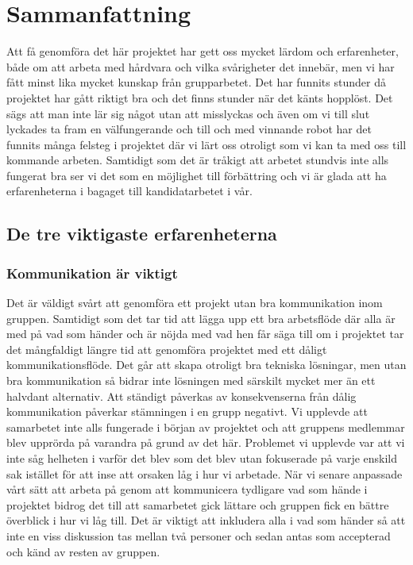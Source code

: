 \documentclass{article}
\begin{document}
\section{Sammanfattning}
Att få genomföra det här projektet har gett oss mycket lärdom och erfarenheter, både om att arbeta med hårdvara och vilka svårigheter det innebär, men vi har fått minst lika mycket kunskap från grupparbetet. Det har funnits stunder då projektet har gått riktigt bra och det finns stunder när det känts hopplöst. Det sägs att man inte lär sig något utan att misslyckas och även om vi till slut lyckades ta fram en välfungerande och till och med vinnande robot har det funnits många felsteg i projektet där vi lärt oss otroligt som vi kan ta med oss till kommande arbeten. Samtidigt som det är tråkigt att arbetet stundvis inte alls fungerat bra ser vi det som en möjlighet till förbättring och vi är glada att ha erfarenheterna i bagaget till kandidatarbetet i vår.

\subsection{De tre viktigaste erfarenheterna}
\subsubsection{Kommunikation är viktigt}
Det är väldigt svårt att genomföra ett projekt utan bra kommunikation inom gruppen. Samtidigt som det tar tid att lägga upp ett bra arbetsflöde där alla är med på vad som händer och är nöjda med vad hen får säga till om i projektet tar det mångfaldigt längre tid att genomföra projektet med ett dåligt kommunikationsflöde. Det går att skapa otroligt bra tekniska lösningar, men utan bra kommunikation så bidrar inte lösningen med särskilt mycket mer än ett halvdant alternativ.
\newline\newline
Att ständigt påverkas av konsekvenserna från dålig kommunikation påverkar stämningen i en grupp negativt. Vi upplevde att samarbetet inte alls fungerade i början av projektet och att gruppens medlemmar blev upprörda på varandra på grund av det här. Problemet vi upplevde var att vi inte såg helheten i varför det blev som det blev utan fokuserade på varje enskild sak istället för att inse att orsaken låg i hur vi arbetade. När vi senare anpassade vårt sätt att arbeta på genom att kommunicera tydligare vad som hände i projektet bidrog det till att samarbetet gick lättare och gruppen fick en bättre överblick i hur vi låg till. Det är viktigt att inkludera alla i vad som händer så att inte en viss diskussion tas mellan två personer och sedan antas som accepterad och känd av resten av gruppen.
\end{document}
